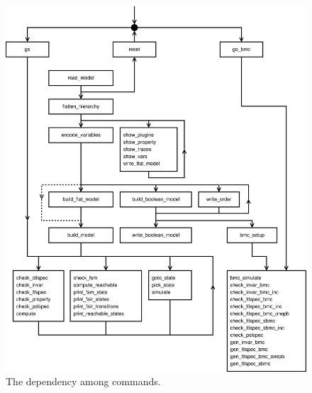 \begin{figure}[t]
\label{flowchart}
\begin{center}
\includegraphics[width=\textwidth]{cmdpo}
\caption{The dependency among \nusmv commands.}
\end{center}
\end{figure}
